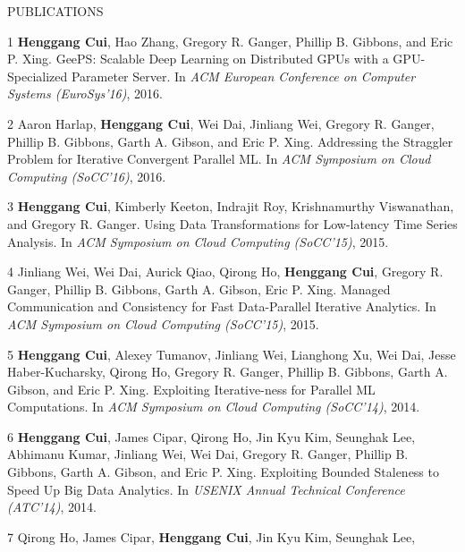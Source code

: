 \documentclass{resume} %
\begin{document}
\begin{rSection}{PUBLICATIONS}
    \item
    [1]
        {\bf Henggang Cui}, Hao Zhang, Gregory R. Ganger, Phillip B. Gibbons, and Eric P. Xing.
        GeePS: Scalable Deep Learning on Distributed GPUs with a GPU-Specialized Parameter Server.
        In \emph{ACM European Conference on Computer Systems (EuroSys'16)},
        2016.
    \item
    [2]
        Aaron Harlap, {\bf Henggang Cui}, Wei Dai, Jinliang Wei,
        Gregory R. Ganger, Phillip B. Gibbons, Garth A. Gibson, and Eric P. Xing.
        Addressing the Straggler Problem for Iterative Convergent Parallel ML.
        In \emph{ACM Symposium on Cloud Computing (SoCC'16)},
        2016.
    \item
    [3]
        {\bf Henggang Cui}, Kimberly Keeton, Indrajit Roy, Krishnamurthy Viswanathan, and Gregory R. Ganger.
        Using Data Transformations for Low-latency Time Series Analysis.
        In \emph{ACM Symposium on Cloud Computing (SoCC'15)},
        2015.
    \item
    [4]
        Jinliang Wei, Wei Dai, Aurick Qiao, Qirong Ho, {\bf Henggang Cui},
        Gregory R. Ganger, Phillip B. Gibbons, Garth A. Gibson, Eric P. Xing.
        Managed Communication and Consistency for Fast Data-Parallel Iterative Analytics.
        In \emph{ACM Symposium on Cloud Computing (SoCC'15)},
        2015.
    \item
    [5]
        {\bf Henggang Cui}, Alexey Tumanov, Jinliang Wei, Lianghong Xu, Wei Dai,
        Jesse Haber-Kucharsky, Qirong Ho, Gregory R. Ganger, Phillip B. Gibbons, Garth A. Gibson, and Eric P. Xing.
        Exploiting Iterative-ness for Parallel ML Computations.
        In \emph{ACM Symposium on Cloud Computing (SoCC'14)},
        2014.
    \item
    [6]
        {\bf Henggang Cui}, James Cipar, Qirong Ho, Jin Kyu Kim, Seunghak Lee, Abhimanu Kumar,
        Jinliang Wei, Wei Dai, Gregory R. Ganger, Phillip B. Gibbons, Garth A. Gibson, and Eric P. Xing.
        Exploiting Bounded Staleness to Speed Up Big Data Analytics.
        In \emph{USENIX Annual Technical Conference (ATC'14)},
        2014.
    \item
    [7]
        Qirong Ho, James Cipar, {\bf Henggang Cui}, Jin Kyu Kim, Seunghak Lee,

\end{rSection}
\end{document}
